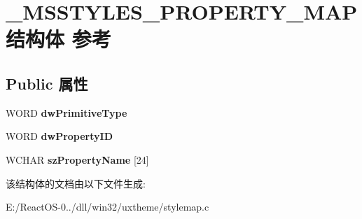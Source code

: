 \hypertarget{struct___m_s_s_t_y_l_e_s___p_r_o_p_e_r_t_y___m_a_p}{}\section{\+\_\+\+M\+S\+S\+T\+Y\+L\+E\+S\+\_\+\+P\+R\+O\+P\+E\+R\+T\+Y\+\_\+\+M\+A\+P结构体 参考}
\label{struct___m_s_s_t_y_l_e_s___p_r_o_p_e_r_t_y___m_a_p}
\subsection*{Public 属性}
\begin{DoxyCompactItemize}
\item 
\mbox{\label{struct___m_s_s_t_y_l_e_s___p_r_o_p_e_r_t_y___m_a_p_a1e8ccda6f3af1d2a158694136c2cc886}} 
W\+O\+RD {\bfseries dw\+Primitive\+Type}
\item 
\mbox{\label{struct___m_s_s_t_y_l_e_s___p_r_o_p_e_r_t_y___m_a_p_adeb95eb2755a5bcfd236fbe9d9adb892}} 
W\+O\+RD {\bfseries dw\+Property\+ID}
\item 
\mbox{\label{struct___m_s_s_t_y_l_e_s___p_r_o_p_e_r_t_y___m_a_p_abf8866b6e836318d95655f68588607b9}} 
W\+C\+H\+AR {\bfseries sz\+Property\+Name} \mbox{[}24\mbox{]}
\end{DoxyCompactItemize}


该结构体的文档由以下文件生成\+:\begin{DoxyCompactItemize}
\item 
E\+:/\+React\+O\+S-\/0../dll/win32/uxtheme/stylemap.\+c\end{DoxyCompactItemize}
